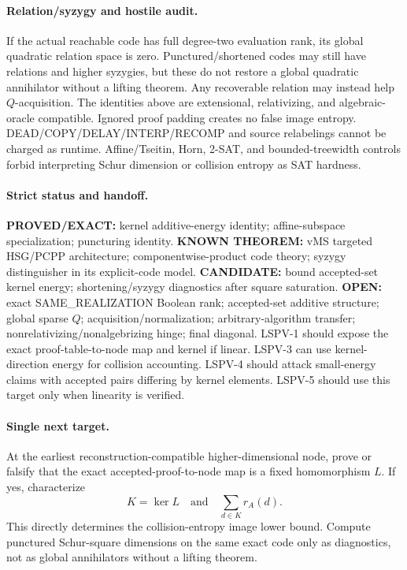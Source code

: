 \documentclass[11pt]{article}
\begin{document}
\paragraph{Relation/syzygy and hostile audit.}
If the actual reachable code has full degree-two evaluation rank, its global quadratic relation space is zero. Punctured/shortened codes may still have relations and higher syzygies, but these do not restore a global quadratic annihilator without a lifting theorem. Any recoverable relation may instead help \(Q\)-acquisition. The identities above are extensional, relativizing, and algebraic-oracle compatible. Ignored proof padding creates no false image entropy. DEAD/COPY/DELAY/INTERP/RECOMP and source relabelings cannot be charged as runtime. Affine/Tseitin, Horn, 2-SAT, and bounded-treewidth controls forbid interpreting Schur dimension or collision entropy as SAT hardness.

\paragraph{Strict status and handoff.}
\textbf{PROVED/EXACT:} kernel additive-energy identity; affine-subspace specialization; puncturing identity.
\textbf{KNOWN THEOREM:} vMS targeted HSG/PCPP architecture; componentwise-product code theory; syzygy distinguisher in its explicit-code model.
\textbf{CANDIDATE:} bound accepted-set kernel energy; shortening/syzygy diagnostics after square saturation.
\textbf{OPEN:} exact SAME\_REALIZATION Boolean rank; accepted-set additive structure; global sparse \(Q\); acquisition/normalization; arbitrary-algorithm transfer; nonrelativizing/nonalgebrizing hinge; final diagonal.
LSPV-1 should expose the exact proof-table-to-node map and kernel if linear. LSPV-3 can use kernel-direction energy for collision accounting. LSPV-4 should attack small-energy claims with accepted pairs differing by kernel elements. LSPV-5 should use this target only when linearity is verified.

\paragraph{Single next target.}
At the earliest reconstruction-compatible higher-dimensional node, prove or falsify that the exact accepted-proof-to-node map is a fixed homomorphism \(L\). If yes, characterize
\[
K=\ker L
\quad\text{and}\quad
\sum_{d\in K}r_A(d).
\]
This directly determines the collision-entropy image lower bound. Compute punctured Schur-square dimensions on the same exact code only as diagnostics, not as global annihilators without a lifting theorem.
\end{document}
